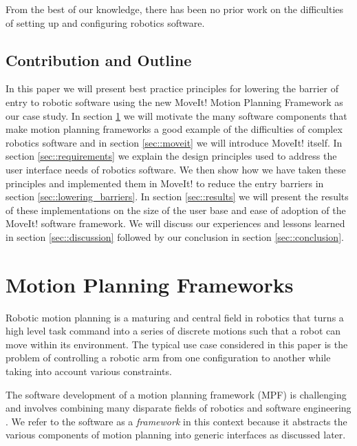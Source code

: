 \documentclass[10pt,journal,compsoc]{joser1}
\begin{document}
{From the best of our knowledge, there has been no prior work on the difficulties of setting up and configuring robotics software.

\subsection{Contribution and Outline}

In this paper we will present best practice principles for lowering the barrier of entry to robotic software using the new MoveIt! Motion Planning Framework as our case study. In section \ref{sec::motion_planning} we will motivate the many software components that make motion planning frameworks a good example of the difficulties of complex robotics software and in section \ref{sec::moveit} we will introduce MoveIt! itself. In section \ref{sec::requirements} we explain the design principles used to address the user interface needs of robotics software. We then show how we have taken these principles and implemented them in MoveIt! to reduce the entry barriers in section \ref{sec::lowering_barriers}. In section \ref{sec::results} we will present the results of these implementations on the size of the user base and ease of adoption of the MoveIt! software framework. We will discuss our experiences and lessons learned in section \ref{sec::discussion} followed by our conclusion in section \ref{sec::conclusion}.

\section{Motion Planning Frameworks}
\label{sec::motion_planning}

Robotic motion planning is a maturing and central field in robotics \cite{moll2011teaching} that turns a high level task command into a series of discrete motions such that a robot can move within its environment. The typical use case considered in this paper is the problem of controlling a robotic arm from one configuration to another while taking into account various constraints.

The software development of a motion planning framework (MPF) is challenging and involves combining many disparate fields of robotics and software engineering \cite{perez2010roadmap}. We refer to the software as a \textit{framework} in this context because it abstracts the various components of motion planning into generic interfaces as discussed later.

}
\end{document}
